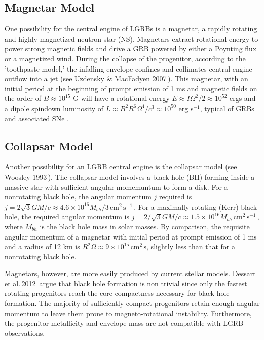 \documentclass{article}
\begin{document}
\subsection{Magnetar Model}

One possibility for the central engine of LGRBs is a magnetar, a rapidly rotating and highly magnetized neutron star (NS). Magnetars extract rotational energy to power strong magnetic fields and drive a GRB powered by either a Poynting flux or a magnetized wind. During the collapse of the progenitor, according to the 'toothpaste model,' the infalling envelope confines and collimates central engine outflow into a jet (see Uzdensky \& MacFadyen 2007\,\cite{Uzdensky:2006wj}). This magnetar, with an initial period at the beginning of prompt emission of 1 ms and magnetic fields on the order of $B \approx 10^{15}$ G will have a rotational energy $E \approx I \Omega^2/2 \approx 10^{52}$ ergs and a dipole spindown luminosity of $L \approx B^2 R^6\Omega^4/c^3 \approx 10^{50}$ erg s$^{-1}$, typical of GRBs and associated SNe \cite{Woosley:2006fn}. 

\subsection{Collapsar Model}

Another possibility for an LGRB central engine is the collapsar model (see Woosley 1993\,\cite{Woosley:1993ap}). The collapsar model involves a black hole (BH) forming inside a massive star with sufficient angular momemuntum to form a disk. For a nonrotating black hole, the angular momentum $j$ required is $j=2 \sqrt{3} GM/c\approx 4.6 \times 10^{16} M_{bh}/3\,\mathrm{cm}^2\,\mathrm{s}^{-1}$\,\cite{Woosley:2006fn}. For a maximally rotating (Kerr) black hole, the required angular momentum is $j=2/\sqrt{3} GM/c \approx 1.5 \times 10^{16} M_{bh}\,\mathrm{cm}^2\,\mathrm{s}^{-1}$\,\cite{Woosley:2006fn}, where $M_{bh}$ is the black hole mass in solar masses.  By comparison, the requisite angular momentum of a magnetar with initial period at prompt emission of 1 ms and a radius of 12 km is $R^2 \Omega \approx 9 \times 10^{15}$\,$\mathrm{cm}^2\,\mathrm{s}$, slightly less than that for a nonrotating black hole.

Magnetars, however, are more easily produced by current stellar models. Dessart et al.\,2012\,\cite{Dessart:2012ap} argue that black hole formation is non trivial since only the fastest rotating progenitors reach the core compactness necessary for black hole formation. The majority of sufficiently compact progenitors retain enough angular momentum to leave them prone to magneto-rotational instability. Furthermore, the progenitor metallicity and envelope mass are not compatible with LGRB observations. 
\end{document}
